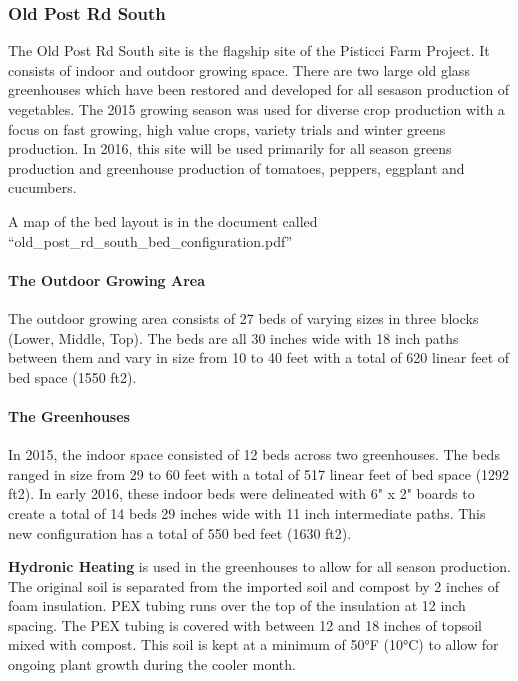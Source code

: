 \subsubsection{Old Post Rd South}\label{old-post-rd-south}

The Old Post Rd South site is the flagship site of the Pisticci Farm
Project. It consists of indoor and outdoor growing space. There are two
large old glass greenhouses which have been restored and developed for
all sesason production of vegetables. The 2015 growing season was used
for diverse crop production with a focus on fast growing, high value
crops, variety trials and winter greens production. In 2016, this site
will be used primarily for all season greens production and greenhouse
production of tomatoes, peppers, eggplant and cucumbers.

A map of the bed layout is in the document called
``old\_post\_rd\_south\_bed\_configuration.pdf''

\paragraph{The Outdoor Growing Area}\label{the-outdoor-growing-area}

The outdoor growing area consists of 27 beds of varying sizes in three
blocks (Lower, Middle, Top). The beds are all 30 inches wide with 18
inch paths between them and vary in size from 10 to 40 feet with a total
of 620 linear feet of bed space (1550 ft2).

\paragraph{The Greenhouses}\label{the-greenhouses}

In 2015, the indoor space consisted of 12 beds across two greenhouses.
The beds ranged in size from 29 to 60 feet with a total of 517 linear
feet of bed space (1292 ft2). In early 2016, these indoor beds were
delineated with 6" x 2" boards to create a total of 14 beds 29 inches
wide with 11 inch intermediate paths. This new configuration has a total
of 550 bed feet (1630 ft2).

\textbf{Hydronic Heating} is used in the greenhouses to allow for all
season production. The original soil is separated from the imported soil
and compost by 2 inches of foam insulation. PEX tubing runs over the top
of the insulation at 12 inch spacing. The PEX tubing is covered with
between 12 and 18 inches of topsoil mixed with compost. This soil is
kept at a minimum of 50°F (10°C) to allow for ongoing plant growth
during the cooler month.

